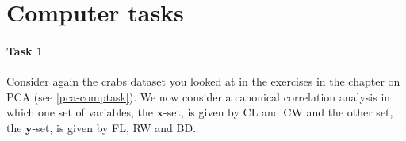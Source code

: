 \documentclass[]{book}
\newenvironment{Shaded}{\begin{snugshade}}{\end{snugshade}}
\newcommand{\CommentTok}[1]{\textcolor[rgb]{0.56,0.35,0.01}{\textit{#1}}}
\newcommand{\DecValTok}[1]{\textcolor[rgb]{0.00,0.00,0.81}{#1}}
\newcommand{\KeywordTok}[1]{\textcolor[rgb]{0.13,0.29,0.53}{\textbf{#1}}}
\newcommand{\NormalTok}[1]{#1}
\newcommand{\OperatorTok}[1]{\textcolor[rgb]{0.81,0.36,0.00}{\textbf{#1}}}
\newcommand{\StringTok}[1]{\textcolor[rgb]{0.31,0.60,0.02}{#1}}
\let\oldparagraph\paragraph
\renewcommand{\paragraph}[1]{\oldparagraph{#1}\mbox{}}
\theoremstyle{definition}
\theoremstyle{definition}
\theoremstyle{definition}
\theoremstyle{remark}
\begin{document}
\hypertarget{computer-tasks-1}{%
\section{Computer tasks}\label{computer-tasks-1}}

\hypertarget{task-1}{%
\paragraph{Task 1}\label{task-1}}

Consider again the crabs dataset you looked at in the exercises in the chapter on PCA (see \ref{pca-comptask}).
We now consider a canonical correlation analysis in which one set of variables, the \(\mathbf x\)-set, is given by CL and CW and the
other set, the \(\mathbf y\)-set, is given by FL, RW and BD.

\begin{Shaded}
\end{Shaded}
\end{document}
